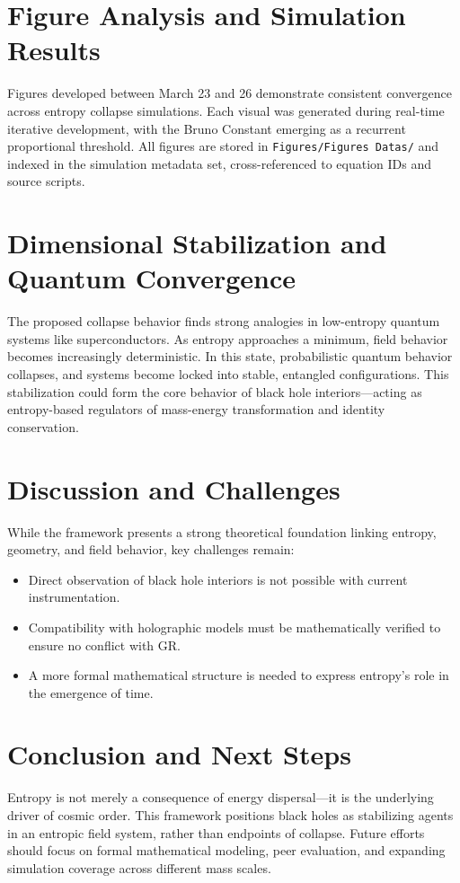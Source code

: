 \documentclass[12pt]{article}
\begin{document}
\section{Figure Analysis and Simulation Results}
Figures developed between March 23 and 26 demonstrate consistent convergence across entropy collapse simulations. Each visual was generated during real-time iterative development, with the Bruno Constant emerging as a recurrent proportional threshold. All figures are stored in \texttt{Figures/Figures Datas/} and indexed in the simulation metadata set, cross-referenced to equation IDs and source scripts.

\section{Dimensional Stabilization and Quantum Convergence}
The proposed collapse behavior finds strong analogies in low-entropy quantum systems like superconductors. As entropy approaches a minimum, field behavior becomes increasingly deterministic. In this state, probabilistic quantum behavior collapses, and systems become locked into stable, entangled configurations. This stabilization could form the core behavior of black hole interiors—acting as entropy-based regulators of mass-energy transformation and identity conservation.

\section{Discussion and Challenges}
While the framework presents a strong theoretical foundation linking entropy, geometry, and field behavior, key challenges remain:
\begin{itemize}
    \item Direct observation of black hole interiors is not possible with current instrumentation.
    \item Compatibility with holographic models must be mathematically verified to ensure no conflict with GR.
    \item A more formal mathematical structure is needed to express entropy's role in the emergence of time.
\end{itemize}

\section{Conclusion and Next Steps}
Entropy is not merely a consequence of energy dispersal—it is the underlying driver of cosmic order. This framework positions black holes as stabilizing agents in an entropic field system, rather than endpoints of collapse. Future efforts should focus on formal mathematical modeling, peer evaluation, and expanding simulation coverage across different mass scales.
\end{document}
